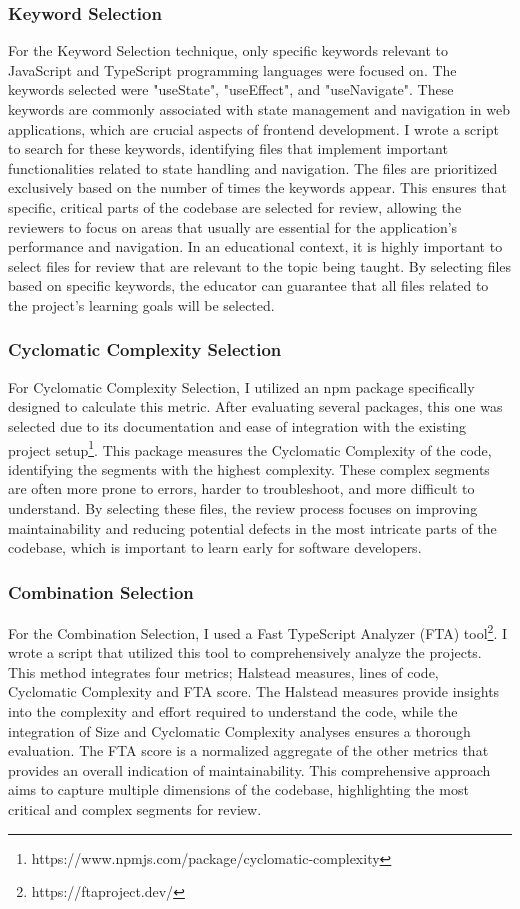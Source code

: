 \subsubsection{Keyword Selection}
For the Keyword Selection technique, only specific keywords relevant to JavaScript and TypeScript programming languages were focused on. The keywords selected were "useState", "useEffect", and "useNavigate". These keywords are commonly associated with state management and navigation in web applications, which are crucial aspects of frontend development. I wrote a script to search for these keywords, identifying files that implement important functionalities related to state handling and navigation. The files are prioritized exclusively based on the number of times the keywords appear. This ensures that specific, critical parts of the codebase are selected for review, allowing the reviewers to focus on areas that usually are essential for the application's performance and navigation. In an educational context, it is highly important to select files for review that are relevant to the topic being taught. By selecting files based on specific keywords, the educator can guarantee that all files related to the project's learning goals will be selected.

\subsubsection{Cyclomatic Complexity Selection}
For Cyclomatic Complexity Selection, I utilized an npm package specifically designed to calculate this metric. After evaluating several packages, 
this one was selected due to its documentation and ease of integration with the existing project setup\footnote{https://www.npmjs.com/package/cyclomatic-complexity}. This package measures the Cyclomatic Complexity of the code, identifying the segments with the highest complexity. These complex segments are often more prone to errors, harder to troubleshoot, and more difficult to understand. By selecting these files, the review process focuses on improving maintainability and reducing potential defects in the most intricate parts of the codebase, which is important to learn early for software developers.

\subsubsection{Combination Selection}
For the Combination Selection, I used a Fast TypeScript Analyzer (FTA) tool\footnote{https://ftaproject.dev/}. I wrote a script that utilized this tool to comprehensively analyze the projects. This method integrates four metrics; Halstead measures, lines of code, Cyclomatic Complexity and FTA score. The Halstead measures provide insights into the complexity and effort required to understand the code, while the integration of Size and Cyclomatic Complexity analyses ensures a thorough evaluation. The FTA score is a normalized aggregate of the other metrics that provides an overall indication of maintainability. This comprehensive approach aims to capture multiple dimensions of the codebase, highlighting the most critical and complex segments for review.



